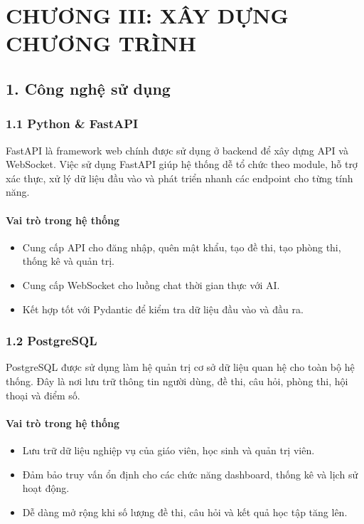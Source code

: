 \documentclass[12pt,a4paper]{article}
\begin{document}
	\section*{CHƯƠNG III: XÂY DỰNG CHƯƠNG TRÌNH}
	
	\subsection*{1. Công nghệ sử dụng}
	
	\subsubsection*{1.1 Python \& FastAPI}
	FastAPI là framework web chính được sử dụng ở backend để xây dựng API và WebSocket. Việc sử dụng FastAPI giúp hệ thống dễ tổ chức theo module, hỗ trợ xác thực, xử lý dữ liệu đầu vào và phát triển nhanh các endpoint cho từng tính năng.
	
	\paragraph{Vai trò trong hệ thống}
	\begin{itemize}
		\item Cung cấp API cho đăng nhập, quên mật khẩu, tạo đề thi, tạo phòng thi, thống kê và quản trị.
		\item Cung cấp WebSocket cho luồng chat thời gian thực với AI.
		\item Kết hợp tốt với Pydantic để kiểm tra dữ liệu đầu vào và đầu ra.
	\end{itemize}
	
	\subsubsection*{1.2 PostgreSQL}
	PostgreSQL được sử dụng làm hệ quản trị cơ sở dữ liệu quan hệ cho toàn bộ hệ thống. Đây là nơi lưu trữ thông tin người dùng, đề thi, câu hỏi, phòng thi, hội thoại và điểm số.
	
	\paragraph{Vai trò trong hệ thống}
	\begin{itemize}
		\item Lưu trữ dữ liệu nghiệp vụ của giáo viên, học sinh và quản trị viên.
		\item Đảm bảo truy vấn ổn định cho các chức năng dashboard, thống kê và lịch sử hoạt động.
		\item Dễ dàng mở rộng khi số lượng đề thi, câu hỏi và kết quả học tập tăng lên.
	\end{itemize}
	
\end{document}
